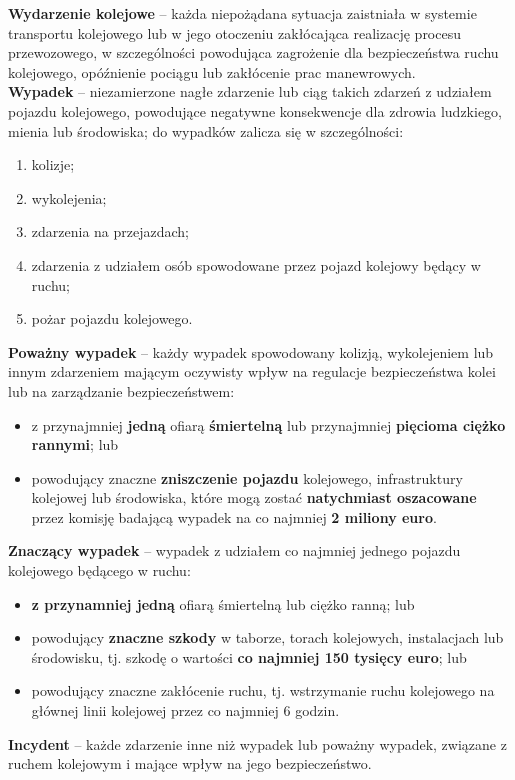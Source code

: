 \textbf{Wydarzenie kolejowe} – każda niepożądana sytuacja zaistniała w systemie transportu kolejowego lub w jego otoczeniu zakłócająca realizację procesu przewozowego, w szczególności powodująca zagrożenie dla bezpieczeństwa ruchu kolejowego, opóźnienie pociągu lub zakłócenie prac manewrowych.
\\
\textbf{Wypadek} 	– niezamierzone nagłe zdarzenie lub ciąg takich zdarzeń z udziałem pojazdu kolejowego, powodujące negatywne konsekwencje dla zdrowia ludzkiego, mienia lub środowiska; 
do wypadków zalicza się w szczególności:
\begin{enumerate}
	\item kolizje;
	\item wykolejenia;
	\item zdarzenia na przejazdach;
	\item zdarzenia z udziałem osób spowodowane przez pojazd kolejowy będący w ruchu;
	\item pożar pojazdu kolejowego.
\end{enumerate}
\textbf{Poważny wypadek} – każdy wypadek spowodowany kolizją, wykolejeniem lub innym
zdarzeniem mającym oczywisty wpływ na regulacje bezpieczeństwa kolei lub na
zarządzanie bezpieczeństwem:
\begin{itemize}
	\item z przynajmniej \textbf{jedną} ofiarą \textbf{śmiertelną} lub przynajmniej \textbf{pięcioma ciężko rannymi};
	lub
	\item powodujący znaczne \textbf{zniszczenie pojazdu} kolejowego, infrastruktury kolejowej lub środowiska, które mogą zostać \textbf{natychmiast oszacowane} przez komisję badającą wypadek na co najmniej \textbf{2 miliony euro}.
\end{itemize}
\textbf{Znaczący wypadek} – wypadek z udziałem co najmniej jednego pojazdu kolejowego
będącego w ruchu:
\begin{itemize}
\item \textbf{z przynamniej jedną} ofiarą śmiertelną lub ciężko ranną;
lub
\item powodujący \textbf{znaczne szkody} w taborze, torach kolejowych, instalacjach lub
środowisku, tj. szkodę o wartości \textbf{co najmniej 150 tysięcy euro};
lub
\item powodujący znaczne zakłócenie ruchu, tj. wstrzymanie ruchu kolejowego na głównej linii kolejowej przez co najmniej 6 godzin.
\end{itemize}

\textbf{Incydent} – każde zdarzenie inne niż wypadek lub poważny wypadek, związane z ruchem kolejowym i mające wpływ na jego bezpieczeństwo.

